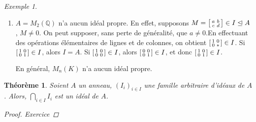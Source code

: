 \documentclass{report}
\newtheorem*{thm}{Th\'eor\`eme}
\theoremstyle{definition}
\theoremstyle{remark}
\newtheorem*{exem}{Exemple}
\newtheorem*{rmq}{Remarque}
\def\ZZ{\mathbb{Z}}
\def\QQ{\mathbb{Q}}
\begin{document}
\begin{exem}
\begin{enumerate}
			\begin{rmq}
				$I$ n'est pas un id\'eal de $M_2(\ZZ)$. En effet, $\begin{bsmallmatrix}
					a&b\\c&d
				\end{bsmallmatrix}\begin{bsmallmatrix}
					0&0\\x&0
				\end{bsmallmatrix} = \begin{bsmallmatrix}
					bx&*\\ *&*
				\end{bsmallmatrix} \notin I$.
			\end{rmq}
			\item $A=M_2(\QQ)$ n'a aucun id\'eal propre. En effet, supposons $M = \begin{bsmallmatrix}
				a&b\\c&d
			\end{bsmallmatrix} \in I \trianglelefteq A$, $M\neq0$. On peut supposer, sans perte de g\'en\'eralit\'e, que $a\neq0$.En effectuant des op\'erations \'el\'ementaires de lignes et de colonnes, on obtient $\begin{bsmallmatrix}
				1&0\\0&*
			\end{bsmallmatrix} \in I$. Si $\begin{bsmallmatrix}
				1&0\\0&1
			\end{bsmallmatrix} \in I$, alors $I=A$. Si $\begin{bsmallmatrix}
				1&0\\0&0
			\end{bsmallmatrix} \in I$, alors $\begin{bsmallmatrix}
				0&0\\0&1
			\end{bsmallmatrix} \in I$, et donc $\begin{bsmallmatrix}
				1&0\\0&1
			\end{bsmallmatrix} \in I$.

			En g\'en\'eral, $M_n(K)$ n'a aucun id\'eal propre.
		\end{enumerate}
	\end{exem}

	\begin{thm}
		Soient $A$ un anneau, $(I_i)_{i \in I}$ une famille arbitraire d'id\'eaux de $A$. Alors, $\bigcap\limits_{i \in I} I_i$ est un id\'eal de $A$.
		\begin{proof}
			Exercice
		\end{proof}
	\end{thm}
\end{document}
